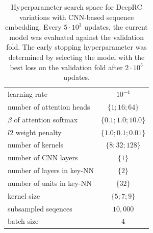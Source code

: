 \documentclass[oneside]{book}
\begin{document}
\begin{table}[htp]%
    \begin{center}%
        \begin{tabular}{lc}%
            \toprule
            learning rate & $10^{-4}$ \\
            number of attention heads & $\{1;16;64\}$ \\
            $\beta$ of attention softmax & $\{0.1;1.0;10.0\}$ \\
            $l2$ weight penalty & $\{1.0;0.1;0.01\}$ \\
            number of kernels & $\{8;32;128\}$ \\
            number of CNN layers & $\{1\}$ \\
            number of layers in key-NN & $\{2\}$ \\
            number of units in key-NN & $\{32\}$ \\
            kernel size & $\{5;7;9\}$ \\
            subsampled seqences & $10,000$ \\
            batch size & $4$ \\
            \bottomrule
        \end{tabular}%
        \caption[Hyperparameter search space for DeepRC variations]{Hyperparameter search space for DeepRC variations with CNN-based sequence embedding.
        Every $5\cdot10^{3}$ updates, the current model was evaluated against the validation fold.
        The early stopping hyperparameter was determined by selecting the model with the best loss
        on the validation fold after $2\cdot10^{5}$ updates.
        }%
        \label{tab:deeprc_variation_settings_cnn}%
    \end{center}%
\end{table}
\end{document}
